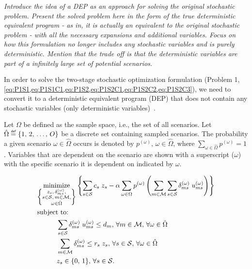 \documentclass[12pt,dvipsnames]{report}
\newcommand\defeq{\mathrel{\overset{\makebox[0pt]{\mbox{\normalfont\tiny\sffamily def}}}{=}}}
\begin{document}
\textit{Introduce the idea of a DEP as an approach for solving the original stochastic problem.  Present the solved problem here in the form of the true deterministic equivalent program - as in, it is actually an equivalent to the original stochastic problem - with all the necessary expansions and additional variables.  Focus on how this formulation no longer includes any stochastic variables and is purely deterministic.  Mention that the trade off is that the deterministic variables are part of a infinitely large set of potential scenarios.}

In order to solve the two-stage stochastic optimization formulation (Problem 1, \cref{eq:P1S1,eq:P1S1C1,eq:P1S2,eq:P1S2C1,eq:P1S2C2,eq:P1S2C3}), we need to convert it to a deterministic equivalent program (DEP) that does not contain any stochastic variables (only deterministic variables)~\cite{stochprogramming}.

Let $\Omega$ be defined as the sample space, i.e., the set of all scenarios.  Let $\hat{\Omega} \defeq \{1,\, 2,\, \ldots,\, O\}$ be a discrete set containing sampled scenarios.  The probability a given scenario $\omega \in \hat{\Omega}$ occurs is denoted by $p^{(\omega)},\, \omega \in \hat{\Omega}$, where $\sum_{\omega \in \hat{\Omega}} p^{(\omega)} = 1$.  Variables that are dependent on the scenario are shown with a superscript ($\omega$) with the specific scenario it is dependent on indicated by $\omega$.

\vspace{3mm}
\begin{tcolorbox}[title = Problem 2 (Deterministic Equivalent Program of Problem 1)]
\begin{align}
& \underset{\left\{ \substack{
	z_s,\, \delta_{ms}^{(\omega)},\\
	s \in \mathcal{S},\, m \in \mathcal{M},\\
	\omega \in \hat{\Omega}} \right\}} {\text{minimize}}
\left\{ \sum_{s \in \mathcal{S}} c_s \; z_s - \alpha \sum_{\omega \in \Omega} p^{(\omega)} \left( \sum_{m \in \mathcal{M}} \sum_{s \in \mathcal{S}} \delta_{ms}^{(\omega)} \; u_{ms}^{(\omega)} \right) \right\} \label{eq:P2}\\
& \text{subject to:}  \nonumber \\
& \hspace{0.4in} \sum_{s \in \mathcal{S}} \delta_{ms}^{(\omega)} \; u_{ms}^{(\omega)} \leq d_m,\, \forall m \in \mathcal{M},\, \forall \omega \in \hat{\Omega} \label{eq:P2C1}\\
& \hspace{0.4in} \sum_{m \in \mathcal{M}} \delta_{ms}^{(\omega)} \leq r_s \; z_s,\, \forall s \in \mathcal{S},\, \forall \omega \in \hat{\Omega} \label{eq:P2C2}\\
& \hspace{0.4in} z_s \in \{0,\, 1\},\, \forall s \in \mathcal{S}. \label{eq:P2C3}
\end{align}
\end{tcolorbox}
\end{document}
